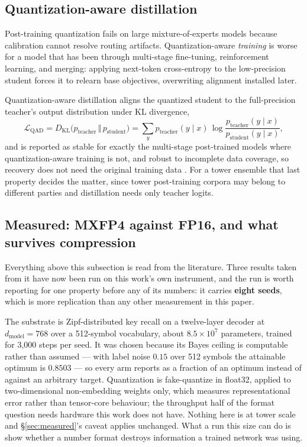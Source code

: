 \documentclass[11pt]{article}
\begin{document}
\subsection{Quantization-aware distillation}

Post-training quantization fails on large mixture-of-experts models because calibration cannot resolve routing artifacts. Quantization-aware \emph{training} is worse for a model that has been through multi-stage fine-tuning, reinforcement learning, and merging: applying next-token cross-entropy to the low-precision student forces it to relearn base objectives, overwriting alignment installed later.

Quantization-aware distillation \cite{nvidia2026qad} aligns the quantized student to the full-precision teacher's output distribution under KL divergence,
\begin{equation}
\mathcal{L}_{\mathrm{QAD}} = D_{\mathrm{KL}}\bigl(p_{\text{teacher}} \,\Vert\, p_{\text{student}}\bigr)
= \sum_y p_{\text{teacher}}(y\mid x)\,\log\frac{p_{\text{teacher}}(y\mid x)}{p_{\text{student}}(y\mid x)} ,
\label{eq:qad}
\end{equation}
and is reported as stable for exactly the multi-stage post-trained models where quantization-aware training is not, and robust to incomplete data coverage, so recovery does not need the original training data \cite{nvidia2026qad}. For a tower ensemble that last property decides the matter, since tower post-training corpora may belong to different parties and distillation needs only teacher logits.

\subsection{Measured: MXFP4 against FP16, and what survives compression}
\label{sec:quantrun}

Everything above this subsection is read from the literature. Three results taken from it have now been run on this work's own instrument, and the run is worth reporting for one property before any of its numbers: it carries \textbf{eight seeds}, which is more replication than any other measurement in this paper.

The substrate is Zipf-distributed key recall on a twelve-layer decoder at $d_{\mathrm{model}} = 768$ over a 512-symbol vocabulary, about $8.5\times10^{7}$ parameters, trained for 3{,}000 steps per seed. It was chosen because its Bayes ceiling is computable rather than assumed --- with label noise $0.15$ over 512 symbols the attainable optimum is $0.8503$ --- so every arm reports as a fraction of an optimum instead of against an arbitrary target. Quantization is fake-quantize in float32, applied to two-dimensional non-embedding weights only, which measures representational error rather than tensor-core behaviour; the throughput half of the format question needs hardware this work does not have. Nothing here is at tower scale and \S\ref{sec:measured}'s caveat applies unchanged. What a run this size can do is show whether a number format destroys information a trained network was using.
\end{document}
